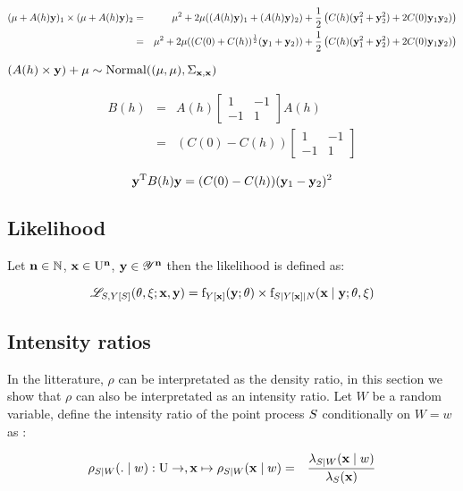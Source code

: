 \begin{eqnarray*}
(\mu+A(h)\mathbf{y})_1\times (\mu+A(h)\mathbf{y})_2&=&
\mu^2+
2\mu((A(h)\mathbf{y})_1+(A(h)\mathbf{y})_2)+\frac12 \left(C(h)(\mathbf{y}_1^2+\mathbf{y}_2^2)+2C(0)\mathbf{y}_1\mathbf{y}_2)\right)\\&=&
\mu^2+
2\mu((C(0)+C(h))^{\frac12}(\mathbf{y}_1+\mathbf{y}_2))+\frac12 \left(C(h)(\mathbf{y}_1^2+\mathbf{y}_2^2)+2C(0)\mathbf{y}_1\mathbf{y}_2)\right)
\end{eqnarray*}



$(A(h)\times\mathbf{y})+\mu\sim\mathrm{Normal}((\mu,\mu),\Sigma_{\mathbf{x},\mathbf{x}})$

\begin{eqnarray*}
    B(h)&=&A(h)\begin{bmatrix}1&-1\\-1&1\end{bmatrix}A(h)\\
        &=&(C(0)-C(h))\begin{bmatrix}1&-1\\-1&1\end{bmatrix}
\end{eqnarray*}


$$\mathbf{y}^{\mathrm{T}} B(h)\mathbf{y}=(C(0)-C(h))(\mathbf{y}_1-\mathbf{y}_2)^2$$


\subsection{Likelihood}
Let $\mathbf{n}\in\mathbb{N}$, $\mathbf{x}\in \mathrm{U}^{\mathbf{n}}$, $\mathbf{y}\in\mathscr{Y}^{\mathbf{n}}$ then the likelihood is defined as:

$$\mathscr{L}_{S,Y[S]}(\theta,\xi;\mathbf{x},\mathbf{y})=
\mathrm{f}_{Y[\mathbf{x}]}(\mathbf{y};\theta)\times \mathrm{f}_{S\mid Y[\mathbf{x}]\mid N}(\mathbf{x}\mid\mathbf{y};\theta,\xi) $$
\subsection{Intensity ratios}
In the litterature, $\rho$ can be interpretated as the density ratio, in this section we show that $\rho$ can also be interpretated as an intensity ratio.
Let $W$ be a random variable, define the intensity ratio of the point process $S$ conditionally on $W=w$ as :

\begin{eqnarray}
\rho_{S\mid W}(.\mid w):\mathrm{U}\to, \mathbf{x}\mapsto \rho_{S\mid W}(\mathbf{x}\mid w)&=&\frac{\lambda_{S\mid W}(\mathbf{x}\mid w)}{\lambda_{S}(\mathbf{x})}\end{eqnarray}





